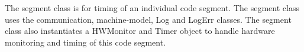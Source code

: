 %



The segment class is for timing of an individual code segment.
The segment class uses the communication, machine-model,
Log and LogErr classes. The segment class also instantiates
a HWMonitor and Timer object to handle hardware monitoring and
timing of this code segment.
